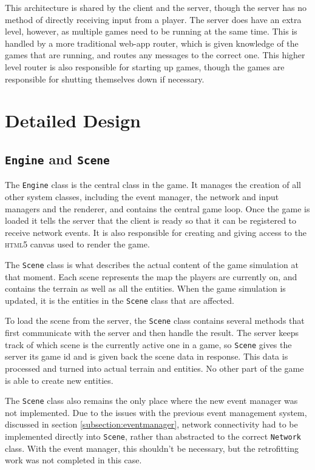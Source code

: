 This architecture is shared by the client and the server, though the server has no method of directly receiving input from a player. The server does have an extra level, however, as multiple games need to be running at the same time. This is handled by a more traditional web-app router, which is given knowledge of the games that are running, and routes any messages to the correct one. This higher level router is also responsible for starting up games, though the games are responsible for shutting themselves down if necessary.


\section{Detailed Design}

\subsection{\texttt{Engine} and \texttt{Scene}}
The \texttt{Engine} class is the central class in the game. It manages the creation of all other system classes, including the event manager, the network and input managers and the renderer, and contains the central game loop. Once the game is loaded it tells the server that the client is ready so that it can be registered to receive network events. It is also responsible for creating and giving access to the \textsc{html5} canvas used to render the game.

The \texttt{Scene} class is what describes the actual content of the game simulation at that moment. Each scene represents the map the players are currently on, and contains the terrain as well as all the entities. When the game simulation is updated, it is the entities in the \texttt{Scene} class that are affected.

To load the scene from the server, the \texttt{Scene} class contains several methods that first communicate with the server and then handle the result. The server keeps track of which scene is the currently active one in a game, so \texttt{Scene} gives the server its game id and is given back the scene data in response. This data is processed and turned into actual terrain and entities. No other part of the game is able to create new entities.

The \texttt{Scene} class also remains the only place where the new event manager was not implemented. Due to the issues with the previous event management system, discussed in section \ref{subsection:eventmanager}, network connectivity had to be implemented directly into \texttt{Scene}, rather than abstracted to the correct \texttt{Network} class. With the event manager, this shouldn't be necessary, but the retrofitting work was not completed in this case.

